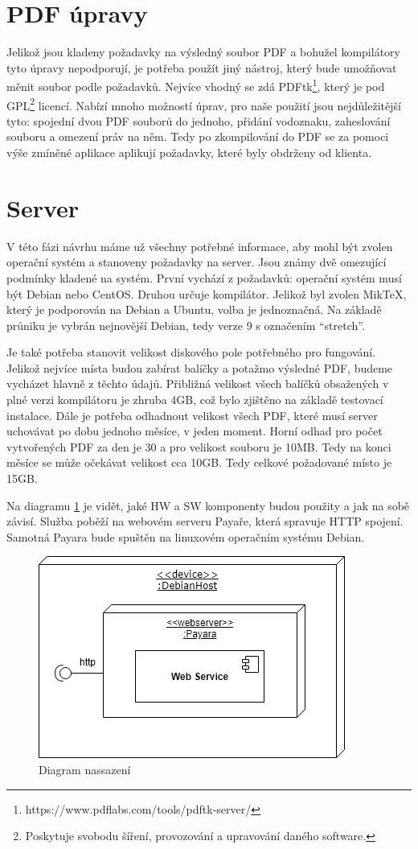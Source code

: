\section{PDF úpravy}
Jelikož jsou kladeny požadavky na výsledný soubor PDF a bohužel kompilátory tyto úpravy nepodporují, je potřeba použít jiný nástroj, který bude umožňovat měnit soubor podle požadavků. Nejvíce vhodný se zdá PDFtk\footnote{https://www.pdflabs.com/tools/pdftk-server/}, který je pod GPL\footnote{Poskytuje svobodu šíření, provozování a upravování daného software.} licencí. Nabízí mnoho možností úprav, pro naše použití jsou nejdůležitější tyto: spojední dvou PDF souborů do jednoho, přidání vodoznaku, zaheslování souboru a omezení práv na něm. Tedy po zkompilování do PDF se za pomoci výše zmíněné aplikace aplikují požadavky, které byly obdrženy od klienta.

\section{Server}
V této fázi návrhu máme už všechny potřebné informace, aby mohl být zvolen operační systém a stanoveny požadavky na server. Jsou známy dvě omezující podmínky kladené na systém. První vychází z požadavků: operační systém musí být Debian nebo CentOS. Druhou určuje kompilátor. Jelikož byl zvolen MikTeX, který je podporován na Debian a Ubuntu, volba je jednoznačná. Na základě průniku je vybrán nejnovější Debian, tedy verze 9 s označením \enquote{stretch}. 
\par
Je také potřeba stanovit velikost diskového pole potřebného pro fungování. Jelikož nejvíce místa budou zabírat balíčky a potažmo výsledné PDF, budeme vycházet hlavně z těchto údajů. Přibližná velikost všech balíčků obsažených v plné verzi kompilátoru je zhruba 4GB, což bylo zjištěno na základě testovací instalace. Dále je potřeba odhadnout velikost všech PDF, které musí server uchovávat po dobu jednoho měsíce, v jeden moment. Horní odhad pro počet vytvořených PDF za den je 30 a pro velikost souboru je 10MB. Tedy na konci měsíce se může očekávat velikost cca 10GB. Tedy celkové požadované místo je 15GB.  
\par 
Na diagramu \ref{fig:deploy} je vidět, jaké HW a SW komponenty budou použity a jak na sobě závisí. Služba poběží na webovém serveru Payaře, která spravuje HTTP spojení. Samotná Payara bude spuštěn na linuxovém operačním systému Debian.
 
\begin{figure}[H]
	\includegraphics[scale=0.7]{deploymentDiagram}
	\centering
	\caption{Diagram nassazení}
	\label{fig:deploy}
\end{figure}
 



